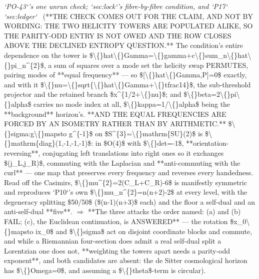 \begin{description}
\textit{`PO-43`'s one unrun check; `sec:lock`'s fibre-by-fibre condition, and `P17` `sec:ledger`} \ (**THE CHECK COMES OUT FOR THE CLAIM, AND NOT BY WORDING: THE TWO HELICITY TOWERS ARE POPULATED ALIKE, SO THE PARITY-ODD ENTRY IS NOT OWED AND THE ROW CLOSES ABOVE THE DECLINED ENTROPY QUESTION.** The condition's entire dependence on the tower is \$\textbackslash\{\}hat\textbackslash\{\}Gamma=\textbackslash\{\}gamma+c\textbackslash\{\}sum\_n\textbackslash\{\}hat\textbackslash\{\}pi\_n\textasciicircum{}\{2\}\$, a sum of squares over a mode set the helicity swap PERMUTES, pairing modes of **equal frequency** --- so \$[\textbackslash\{\}hat\textbackslash\{\}Gamma,P]=0\$ exactly, and with it \$\textbackslash\{\}nu=\textbackslash\{\}sqrt\{\textbackslash\{\}hat\textbackslash\{\}Gamma+\textbackslash\{\}tfrac14\}\$, the sub-threshold projector and the retained branch \$x\textasciicircum{}\{1/2+\textbackslash\{\}nu\}\$; and \$\textbackslash\{\}beta=2\textbackslash\{\}pi\textbackslash\{\}alpha\$ carries no mode index at all, \$\textbackslash\{\}kappa=1/\textbackslash\{\}alpha\$ being the **background** horizon's.  **AND THE EQUAL FREQUENCIES ARE FORCED BY AN ISOMETRY RATHER THAN BY ARITHMETIC.** \$\textbackslash\{\}sigma:g\textbackslash\{\}mapsto g\textasciicircum{}\{-1\}\$ on \$S\textasciicircum{}\{3\}=\textbackslash\{\}mathrm\{SU\}(2)\$ is \$\textbackslash\{\}mathrm\{diag\}(1,-1,-1,-1)\$: in \$O(4)\$ with \$\textbackslash\{\}det=-1\$, **orientation-reversing**, conjugating left translations into right ones so it exchanges \$(j\_L,j\_R)\$, commuting with the Laplacian and **anti-commuting with the curl** --- one map that preserves every frequency and reverses every handedness. Read off the Casimirs, \$\textbackslash\{\}mu\textasciicircum{}\{2\}=2(C\_L+C\_R)-6\$ is manifestly symmetric and reproduces `P10`'s own \$\textbackslash\{\}mu\_n\textasciicircum{}\{2\}=n(n+2)-2\$ at every level, with the degeneracy splitting \$50/50\$ (\$(n-1)(n+3)\$ each) and the floor a self-dual and an anti-self-dual **five**. \ensuremath{\Rightarrow} **The three attacks the order named: (a) and (b) FAIL; (c), the Euclidean continuation, is ANSWERED** --- the rotation \$x\_0\textbackslash\{\}mapsto ix\_0\$ and \$\textbackslash\{\}sigma\$ act on disjoint coordinate blocks and commute, and while a Riemannian four-section does admit a real self-dual split a Lorentzian one does not, **weighting the towers apart needs a parity-odd exponent**, and both candidates are absent: the de Sitter cosmological horizon has \$\textbackslash\{\}Omega=0\$, and assuming a \$\textbackslash\{\}theta\$-term is circular). 

\end{description}
